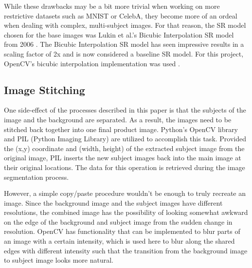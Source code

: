 While these drawbacks may be a bit more trivial when working on more restrictive
datasets such as MNIST or CelebA, they become more of an ordeal when dealing
with complex, multi-subject images. For that reason, the SR model chosen for the
base images was Lukin et al.’s Bicubic Interpolation SR model from 2006
\cite{Lukin2006}. The Bicubic Interpolation SR model has seen impressive results in a scaling
factor of 2x and is now considered a baseline SR model. For this project,
OpenCV’s bicubic interpolation implementation was used \cite{Bradski2000}.

\subsection{Image Stitching}
One side-effect of the processes described in this paper is that the subjects of
the image and the background are separated. As a result, the images need to be
stitched back together into one final product image. Python’s OpenCV library and
PIL (Python Imaging Library) are utilized to accomplish this task. Provided the
(x,y) coordinate and (width, height) of the extracted subject image from the
original image, PIL inserts the new subject images back into the main image at
their original locations. The data for this operation is retrieved during the
image segmentation process.

However, a simple copy/paste procedure wouldn’t be enough to truly recreate an
image. Since the background image and the subject images have different
resolutions, the combined image has the possibility of looking somewhat awkward
on the edge of the background and subject image from the sudden change in
resolution. OpenCV has functionality that can be implemented to blur parts of an
image with a certain intensity, which is used here to blur along the shared
edges with different intensity such that the transition from the background
image to subject image looks more natural.
